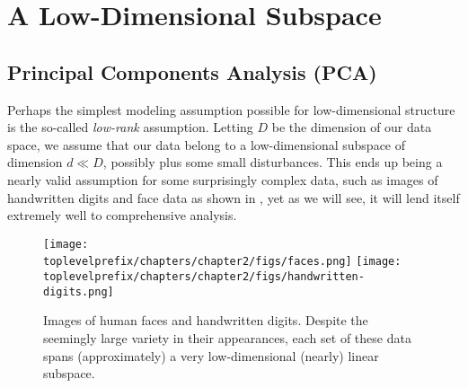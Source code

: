 \documentclass[../../book-main.tex]{subfiles}
\begin{document}
\section{A Low-Dimensional Subspace} \label{sec:lowrank}

\subsection{Principal Components Analysis (PCA)}\label{sub:pca}

Perhaps the simplest modeling assumption possible for low-dimensional structure
is the so-called \textit{low-rank} assumption. Letting \(D\) be the dimension of
our data space, we assume that our data belong to a low-dimensional subspace of dimension \(d \ll D\), possibly plus some small disturbances. This ends up being a nearly valid assumption for some surprisingly complex data, such as images of handwritten digits and face data \cite{BasriR2003-PAMI} as shown in , yet as we will see, it will lend itself extremely well to comprehensive analysis. 

\begin{figure}
    \centering
    \texttt{[image: \\toplevelprefix/chapters/chapter2/figs/faces.png]}
    \hspace{5mm} \texttt{[image: \\toplevelprefix/chapters/chapter2/figs/handwritten-digits.png]}   
    \caption{Images of human faces and handwritten digits. Despite the seemingly large variety in their appearances, each set of these data spans (approximately) a very low-dimensional (nearly) linear subspace.}
    \label{fig:faces-digits}
\end{figure}
\end{document}
